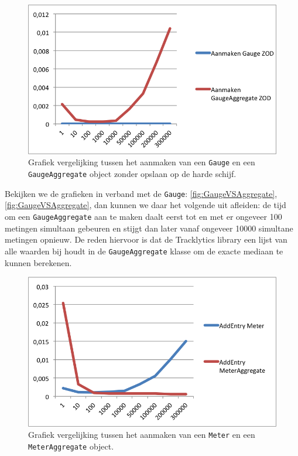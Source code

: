 \begin{figure}[h]
  \centering
  \includegraphics[scale=1.0]{Afbeeldingen/Evaluatie/GaugeVSAggregateZOD}
  \caption{Grafiek vergelijking tussen het aanmaken van een \texttt{Gauge} en een \texttt{GaugeAggregate} object zonder opslaan op de harde schijf.}
  \label{fig:GaugeVSAggregateZOD}
\end{figure}



Bekijken we de grafieken in verband met de \texttt{Gauge}: \ref{fig:GaugeVSAggregate}, \ref{fig:GaugeVSAggregate}, dan kunnen we daar het volgende uit afleiden: de tijd om een \texttt{GaugeAggregate} aan te maken daalt eerst tot en met er ongeveer 100 metingen simultaan gebeuren en stijgt dan later vanaf ongeveer 10000 simultane metingen opnieuw. De reden hiervoor is dat de Tracklytics library een lijst van alle waarden bij houdt in de \texttt{GaugeAggregate} klasse om de exacte mediaan te kunnen berekenen. \\

\begin{figure}[h]
  \centering
  \includegraphics[scale=1.0]{Afbeeldingen/Evaluatie/MeterVSAggregate}
  \caption{Grafiek vergelijking tussen het aanmaken van een \texttt{Meter} en een \texttt{MeterAggregate} object.}
  \label{fig:MeterVSAggregate}
\end{figure}

